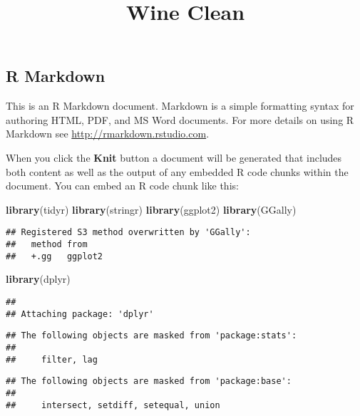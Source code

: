 \documentclass[
]{article}
\title{Wine Clean}
\author{}
\date{\vspace{-2.5em}}
\newenvironment{Shaded}{\begin{snugshade}}{\end{snugshade}}
\newcommand{\KeywordTok}[1]{\textcolor[rgb]{0.13,0.29,0.53}{\textbf{#1}}}
\newcommand{\NormalTok}[1]{#1}
\begin{document}
\maketitle

\hypertarget{r-markdown}{%
\subsection{R Markdown}\label{r-markdown}}

This is an R Markdown document. Markdown is a simple formatting syntax
for authoring HTML, PDF, and MS Word documents. For more details on
using R Markdown see \url{http://rmarkdown.rstudio.com}.

When you click the \textbf{Knit} button a document will be generated
that includes both content as well as the output of any embedded R code
chunks within the document. You can embed an R code chunk like this:

\begin{Shaded}
\begin{Highlighting}[]
\KeywordTok{library}\NormalTok{(tidyr)}
\KeywordTok{library}\NormalTok{(stringr)}
\KeywordTok{library}\NormalTok{(ggplot2)}
\KeywordTok{library}\NormalTok{(GGally)}
\end{Highlighting}
\end{Shaded}

\begin{verbatim}
## Registered S3 method overwritten by 'GGally':
##   method from   
##   +.gg   ggplot2
\end{verbatim}

\begin{Shaded}
\begin{Highlighting}[]
\KeywordTok{library}\NormalTok{(dplyr)}
\end{Highlighting}
\end{Shaded}

\begin{verbatim}
## 
## Attaching package: 'dplyr'
\end{verbatim}

\begin{verbatim}
## The following objects are masked from 'package:stats':
## 
##     filter, lag
\end{verbatim}

\begin{verbatim}
## The following objects are masked from 'package:base':
## 
##     intersect, setdiff, setequal, union
\end{verbatim}
\end{document}
